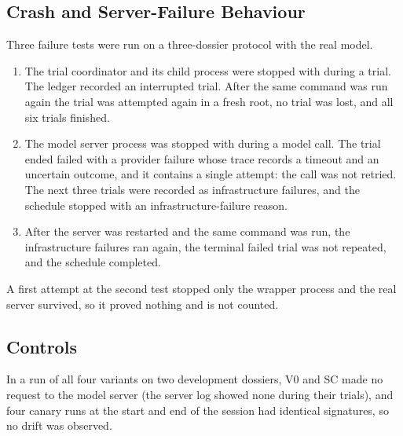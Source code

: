 \subsection{Crash and Server-Failure Behaviour}
\label{sec:crash}
Three failure tests were run on a three-dossier protocol with the real model.
\begin{enumerate}[itemsep=2pt]
\item The trial coordinator and its child process were stopped with  during a trial. The ledger
      recorded an interrupted trial. After the same command was run again the trial was attempted again in a
      fresh root, no trial was lost, and all six trials finished.
\item The model server process was stopped with  during a model call. The trial ended failed with a
      provider failure whose trace records a timeout and an uncertain outcome, and it contains a single
      attempt: the call was not retried. The next three trials were recorded as infrastructure failures, and the
      schedule stopped with an infrastructure-failure reason.
\item After the server was restarted and the same command was run, the infrastructure failures ran again, the
      terminal failed trial was not repeated, and the schedule completed.
\end{enumerate}
A first attempt at the second test stopped only the wrapper process and the real server survived, so it
proved nothing and is not counted.

\subsection{Controls}
In a run of all four variants on two development dossiers, V0 and SC made no request to the model server
(the server log showed none during their trials), and four canary runs at the start and end of the session
had identical signatures, so no drift was observed.

